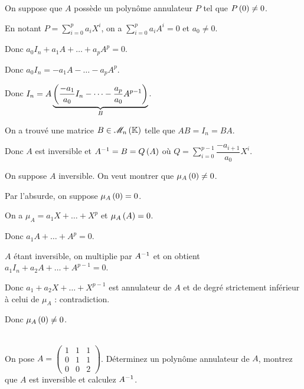 \begin{dem}
\imprec

On suppose que \(A\) possède un polynôme annulateur \(P\) tel que \(P\left(0\right)\not=0\).

En notant \(P=\sum_{i=0}^pa_iX^i\), on a \(\sum_{i=0}^pa_iA^i=0\) et \(a_0\not=0\).

Donc \(a_0I_n+a_1A+\dots+a_pA^p=0\).

Donc \(a_0I_n=-a_1A-\dots-a_pA^p\).

Donc \(I_n=A\underbrace{\left(\dfrac{-a_1}{a_0}I_n-\dots-\dfrac{a_p}{a_0}A^{p-1}\right)}_{B}\).

On a trouvé une matrice \(B\in\M{n}\) telle que \(AB=I_n=BA\).

Donc \(A\) est inversible et \(A^{-1}=B=Q\left(A\right)\) où \(Q=\sum_{i=0}^{p-1}\dfrac{-a_{i+1}}{a_0}X^i\).

\impdir

On suppose \(A\) inversible. On veut montrer que \(\mu_A\left(0\right)\not=0\).

Par l'absurde, on suppose \(\mu_A\left(0\right)=0\).

On a \(\mu_A=a_1X+\dots+X^p\) et \(\mu_A\left(A\right)=0\).

Donc \(a_1A+\dots+A^p=0\).

\(A\) étant inversible, on multiplie par \(A^{-1}\) et on obtient \(a_1I_n+a_2A+\dots+A^{p-1}=0\).

Donc \(a_1+a_2X+\dots+X^{p-1}\) est annulateur de \(A\) et de degré strictement inférieur à celui de \(\mu_A\) : contradiction.

Donc \(\mu_A\left(0\right)\not=0\).
\end{dem}

\begin{exo}~\\
On pose \(A=\begin{pmatrix}
1 & 1 & 1 \\
0 & 1 & 1 \\
0 & 0 & 2
\end{pmatrix}\). Déterminez un polynôme annulateur de \(A\), montrez que \(A\) est inversible et calculez \(A^{-1}\).
\end{exo}

